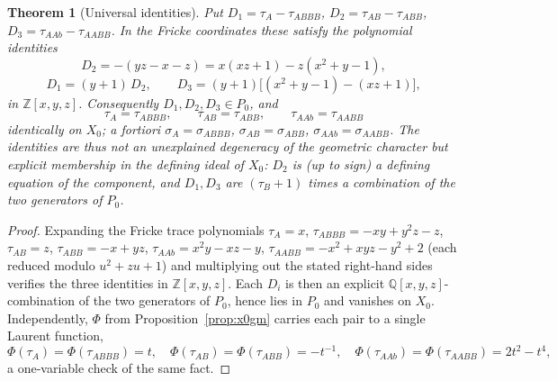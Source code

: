 \documentclass[11pt,a4paper]{article}
\newtheorem{theorem}{Theorem}[section]
\theoremstyle{definition}
\theoremstyle{remark}
\newcommand{\Q}{\mathbb{Q}}
\newcommand{\Z}{\mathbb{Z}}
\begin{document}
\begin{theorem}[Universal identities]
\label{thm:universal}
Put $D_1 = \tau_A - \tau_{ABBB}$, $D_2 = \tau_{AB} - \tau_{ABB}$,
$D_3 = \tau_{AAb} - \tau_{AABB}$. In the Fricke coordinates these
satisfy the polynomial identities
\begin{equation}
D_2 = -(yz - x - z) = x(xz+1) - z(x^2+y-1),
\end{equation}
\begin{equation}
D_1 = (y+1)\,D_2, \qquad
D_3 = (y+1)\bigl[(x^2+y-1) - (xz+1)\bigr],
\end{equation}
in $\Z[x,y,z]$. Consequently $D_1, D_2, D_3 \in P_0$, and
\begin{equation}
\tau_A = \tau_{ABBB}, \qquad
\tau_{AB} = \tau_{ABB}, \qquad
\tau_{AAb} = \tau_{AABB}
\end{equation}
identically on $X_0$; a fortiori $\sigma_A = \sigma_{ABBB}$,
$\sigma_{AB} = \sigma_{ABB}$, $\sigma_{AAb} = \sigma_{AABB}$. The
identities are thus not an unexplained degeneracy of the geometric
character but explicit membership in the defining ideal of $X_0$:
$D_2$ is (up to sign) a defining equation of the component, and
$D_1, D_3$ are $(\tau_B+1)$ times a combination of the two generators
of $P_0$.
\end{theorem}

\begin{proof}
Expanding the Fricke trace polynomials
$\tau_A = x$, $\tau_{ABBB} = -xy + y^2 z - z$,
$\tau_{AB} = z$, $\tau_{ABB} = -x + yz$,
$\tau_{AAb} = x^2 y - xz - y$,
$\tau_{AABB} = -x^2 + xyz - y^2 + 2$
(each reduced modulo $u^2 + zu + 1$) and multiplying out the stated
right-hand sides verifies the three identities in $\Z[x,y,z]$. Each
$D_i$ is then an explicit $\Q[x,y,z]$-combination of the two
generators of $P_0$, hence lies in $P_0$ and vanishes on $X_0$.
Independently, $\Phi$ from Proposition~\ref{prop:x0gm} carries each
pair to a single Laurent function,
\begin{equation}
\Phi(\tau_A) = \Phi(\tau_{ABBB}) = t, \quad
\Phi(\tau_{AB}) = \Phi(\tau_{ABB}) = -t^{-1}, \quad
\Phi(\tau_{AAb}) = \Phi(\tau_{AABB}) = 2t^2 - t^4,
\end{equation}
a one-variable check of the same fact.
\end{proof}
\end{document}

